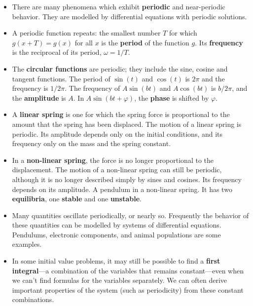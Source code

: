\begin{itemize}

\item There are many phenomena which exhibit {\bf periodic} and
  near-periodic behavior.  They are modelled by differential equations
  with periodic solutions.

\item A periodic function repeats: the smallest number $T$ for which
  $g(x+T) = g(x)$ for all $x$ is the {\bf period} of the function $g$.
  Its {\bf frequency} is the reciprocal of its period, $\omega = 1/T$.


\item The {\bf circular functions} are periodic; they include the
  sine, cosine and tangent functions.  The period of $\sin(t)$ and
  $\cos(t)$ is $2 \pi$ and the frequency is $1/2 \pi$. The frequency
  of $A\sin(bt)$ and $A\cos(bt)$ is $b/2 \pi$, and the {\bf amplitude}
  is $A$.  In $A \sin(bt + \varphi)$, the {\bf phase} is shifted by
  $\varphi$.

\item A {\bf linear spring} is one for which the spring force is
  proportional to the amount that the spring has been displaced.  The
  motion of a linear spring is periodic.  Its amplitude depends only
  on the initial conditions, and its frequency only on the mass and
  the spring constant.

\item In a {\bf non-linear spring}, the force is no longer
  proportional to the displacement.  The motion of a non-linear spring
  can still be periodic, although it is no longer described simply by
  sines and cosines.  Its frequency depends on its amplitude.  A
  pendulum in a non-linear spring.  It has two {\bf equilibria}, one
  {\bf stable} and one {\bf unstable}.

\item Many quantities oscillate periodically, or nearly so.
  Frequently the behavior of these quantities can be modelled by
  systems of differential equations.  Pendulums, electronic
  components, and animal populations are some examples.

\item In some initial value problems, it may still be possible to find
  a {\bf first integral}---a combination of the variables that remains
  constant---even when we can't find formulas for the variables
  separately.  We can often derive important properties of the system
  (such as periodicity) from these constant combinations.
\end{itemize}

